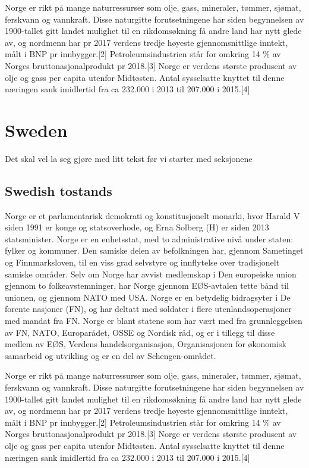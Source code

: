 \documentclass{book}
\begin{document}
Norge er rikt på mange naturressurser som olje, gass, mineraler, tømmer, sjømat, ferskvann og vannkraft. Disse naturgitte forutsetningene har siden begynnelsen av 1900-tallet gitt landet mulighet til en rikdomsøkning få andre land har nytt glede av, og nordmenn har pr 2017 verdens tredje høyeste gjennomsnittlige inntekt, målt i BNP pr innbygger.[2] Petroleumsindustrien står for omkring 14 \% av Norges bruttonasjonalprodukt pr 2018.[3] Norge er verdens største produsent av olje og gass per capita utenfor Midtøsten. Antal sysselsatte knyttet til denne næringen sank imidlertid fra ca 232.000 i 2013 til 207.000 i 2015.[4]



\chapter{Sweden}
Det skal vel la seg gjøre med litt tekst før vi starter med seksjonene

\section{Swedish tostands}
Norge er et parlamentarisk demokrati og konstitusjonelt monarki, hvor Harald V siden 1991 er konge og statsoverhode, og Erna Solberg (H) er siden 2013 statsminister. Norge er en enhetsstat, med to administrative nivå under staten: fylker og kommuner. Den samiske delen av befolkningen har, gjennom Sametinget og Finnmarksloven, til en viss grad selvstyre og innflytelse over tradisjonelt samiske områder. Selv om Norge har avvist medlemskap i Den europeiske union gjennom to folkeavstemninger, har Norge gjennom EØS-avtalen tette bånd til unionen, og gjennom NATO med USA. Norge er en betydelig bidragsyter i De forente nasjoner (FN), og har deltatt med soldater i flere utenlandsoperasjoner med mandat fra FN. Norge er blant statene som har vært med fra grunnleggelsen av FN, NATO, Europarådet, OSSE og Nordisk råd, og er i tillegg til disse medlem av EØS, Verdens handelsorganisasjon, Organisasjonen for økonomisk samarbeid og utvikling og er en del av Schengen-området.

Norge er rikt på mange naturressurser som olje, gass, mineraler, tømmer, sjømat, ferskvann og vannkraft. Disse naturgitte forutsetningene har siden begynnelsen av 1900-tallet gitt landet mulighet til en rikdomsøkning få andre land har nytt glede av, og nordmenn har pr 2017 verdens tredje høyeste gjennomsnittlige inntekt, målt i BNP pr innbygger.[2] Petroleumsindustrien står for omkring 14 \% av Norges bruttonasjonalprodukt pr 2018.[3] Norge er verdens største produsent av olje og gass per capita utenfor Midtøsten. Antal sysselsatte knyttet til denne næringen sank imidlertid fra ca 232.000 i 2013 til 207.000 i 2015.[4]
\end{document}
